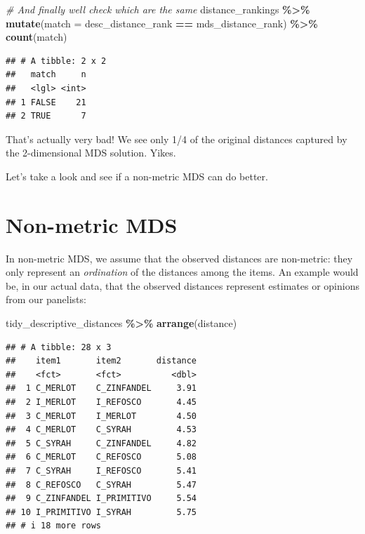 \documentclass[
]{book}
\newenvironment{Shaded}{\begin{snugshade}}{\end{snugshade}}
\newcommand{\AttributeTok}[1]{\textcolor[rgb]{0.13,0.29,0.53}{#1}}
\newcommand{\CommentTok}[1]{\textcolor[rgb]{0.56,0.35,0.01}{\textit{#1}}}
\newcommand{\FunctionTok}[1]{\textcolor[rgb]{0.13,0.29,0.53}{\textbf{#1}}}
\newcommand{\NormalTok}[1]{#1}
\newcommand{\SpecialCharTok}[1]{\textcolor[rgb]{0.81,0.36,0.00}{\textbf{#1}}}
\begin{document}
\begin{Shaded}
\begin{Highlighting}[]
  \CommentTok{\# And finally we\textquotesingle{}ll check which are the same}
\NormalTok{distance\_rankings }\SpecialCharTok{\%\textgreater{}\%}
  \FunctionTok{mutate}\NormalTok{(}\AttributeTok{match =}\NormalTok{ desc\_distance\_rank }\SpecialCharTok{==}\NormalTok{ mds\_distance\_rank) }\SpecialCharTok{\%\textgreater{}\%}
  \FunctionTok{count}\NormalTok{(match)}
\end{Highlighting}
\end{Shaded}

\begin{verbatim}
## # A tibble: 2 x 2
##   match     n
##   <lgl> <int>
## 1 FALSE    21
## 2 TRUE      7
\end{verbatim}

That's actually very bad! We see only 1/4 of the original distances captured by the 2-dimensional MDS solution. Yikes.

Let's take a look and see if a non-metric MDS can do better.

\section{Non-metric MDS}\label{non-metric-mds}

In non-metric MDS, we assume that the observed distances are non-metric: they only represent an \emph{ordination} of the distances among the items. An example would be, in our actual data, that the observed distances represent estimates or opinions from our panelists:

\begin{Shaded}
\begin{Highlighting}[]
\NormalTok{tidy\_descriptive\_distances }\SpecialCharTok{\%\textgreater{}\%}
  \FunctionTok{arrange}\NormalTok{(distance)}
\end{Highlighting}
\end{Shaded}

\begin{verbatim}
## # A tibble: 28 x 3
##    item1       item2       distance
##    <fct>       <fct>          <dbl>
##  1 C_MERLOT    C_ZINFANDEL     3.91
##  2 I_MERLOT    I_REFOSCO       4.45
##  3 C_MERLOT    I_MERLOT        4.50
##  4 C_MERLOT    C_SYRAH         4.53
##  5 C_SYRAH     C_ZINFANDEL     4.82
##  6 C_MERLOT    C_REFOSCO       5.08
##  7 C_SYRAH     I_REFOSCO       5.41
##  8 C_REFOSCO   C_SYRAH         5.47
##  9 C_ZINFANDEL I_PRIMITIVO     5.54
## 10 I_PRIMITIVO I_SYRAH         5.75
## # i 18 more rows
\end{verbatim}
\end{document}
